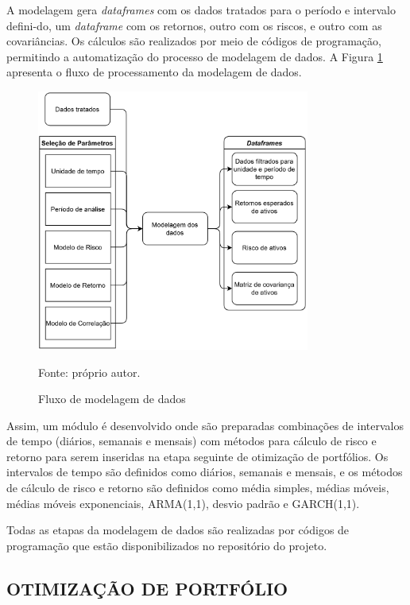         \ipar A modelagem gera \textit{dataframes} com os dados tratados para o período e intervalo defini-do, um \textit{dataframe} com os retornos, outro com os riscos, e outro com as covariâncias. Os cálculos são realizados por meio de códigos de programação, permitindo a automatização do processo de modelagem de dados. A Figura \ref{fig:fluxo_modelagem} apresenta o fluxo de processamento da modelagem de dados.

        \begin{figure}[H]
            \centering
            \caption{Fluxo de modelagem de dados}
            \label{fig:fluxo_modelagem}
            \includegraphics[width=0.8\textwidth]{imagens/fluxo_modelagem.png}
            \par \footnotesize Fonte: próprio autor.
        \end{figure}

        \ipar Assim, um módulo é desenvolvido onde são preparadas combinações de intervalos de tempo (diários, semanais e mensais) com métodos para cálculo de risco e retorno para serem inseridas na etapa seguinte de otimização de portfólios. Os intervalos de tempo são definidos como diários, semanais e mensais, e os métodos de cálculo de risco e retorno são definidos como média simples, médias móveis, médias móveis exponenciais, \acrshort{ARMA}(1,1), desvio padrão e \acrshort{GARCH}(1,1).

        \ipar Todas as etapas da modelagem de dados são realizadas por códigos de programação que estão disponibilizados no repositório do projeto.

    \subsection{OTIMIZAÇÃO DE PORTFÓLIO}

